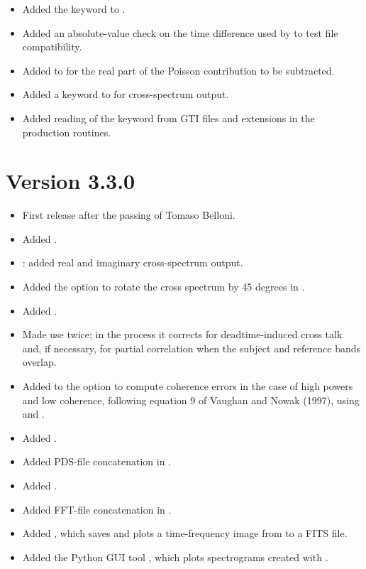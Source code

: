 \begin{itemize}
\item Added the  keyword to .
\item Added an absolute-value check on the time difference used by
       to test file compatibility.
\item Added  to  for the real part of the
      Poisson contribution to be subtracted.
\item Added a keyword to  for cross-spectrum output.
\item Added reading of the  keyword from GTI files and
      extensions in the  production routines.
\end{itemize}

\section*{Version 3.3.0}

\begin{itemize}
\item First release after the passing of Tomaso Belloni.
\item Added .
\item {}: added real and imaginary cross-spectrum
      output.
\item Added the option to rotate the cross spectrum by 45 degrees in
      .
\item Added .
\item Made  use  twice; in the
      process it corrects for deadtime-induced cross talk and, if necessary,
      for partial correlation when the subject and reference bands overlap.
\item Added to  the option to compute coherence errors in the
      case of high powers and low coherence, following equation 9 of Vaughan
      and Nowak (1997), using  and
      .
\item Added .
\item Added PDS-file concatenation in .
\item Added .
\item Added FFT-file concatenation in .
\item Added , which saves and plots a time-frequency image
      from  to a FITS file.
\item Added the Python GUI tool , which plots
      spectrograms created with .
\end{itemize}
